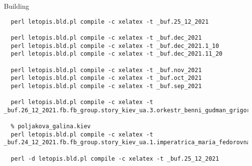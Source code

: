  
 
 
 
 
Building

\begin{verbatim}
  perl letopis.bld.pl compile -c xelatex -t _buf.25_12_2021

  perl letopis.bld.pl compile -c xelatex -t _buf.dec_2021
  perl letopis.bld.pl compile -c xelatex -t _buf.dec_2021.1_10
  perl letopis.bld.pl compile -c xelatex -t _buf.dec_2021.11_20

  perl letopis.bld.pl compile -c xelatex -t _buf.nov_2021
  perl letopis.bld.pl compile -c xelatex -t _buf.oct_2021
  perl letopis.bld.pl compile -c xelatex -t _buf.sep_2021

  perl letopis.bld.pl compile -c xelatex -t _buf.26_12_2021.fb.fb_group.story_kiev_ua.3.orkestr_benni_gudman_grigorij_chapkis_1962

  % poljakova_galina.kiev
  perl letopis.bld.pl compile -c xelatex -t _buf.24_12_2021.fb.fb_group.story_kiev_ua.1.imperatrica_maria_fedorovna

  perl -d letopis.bld.pl compile -c xelatex -t _buf.25_12_2021

\end{verbatim}
